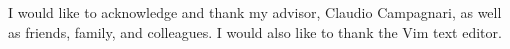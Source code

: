 \begin{acknowledgements}

I would like to acknowledge and thank my advisor, Claudio Campagnari, as well as friends, family, and colleagues.
I would also like to thank the Vim text editor.

\end{acknowledgements} 
